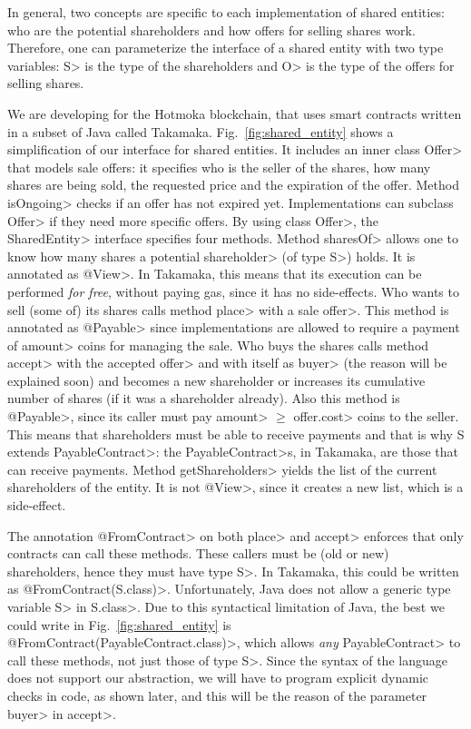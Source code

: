 In general, two concepts are specific to each implementation of shared entities:
who are the potential shareholders and how offers for selling shares work.
Therefore, one can parameterize the interface of a shared entity with two type variables:
\<S> is the type of the shareholders and \<O> is the type of the offers for selling shares.

We are developing for the Hotmoka blockchain, that uses smart contracts written in a subset
of Java called Takamaka.
Fig.~\ref{fig:shared_entity} shows a simplification of our interface for shared entities.
It includes an inner class \<Offer> that models sale offers:
it specifies who is the seller of the shares,
how many shares are being sold, the requested price and the expiration of the offer.
Method \<isOngoing> checks if an offer has not expired yet.
Implementations can subclass \<Offer> if they need more specific offers.
By using class \<Offer>, the \<SharedEntity> interface specifies four methods.
Method \<sharesOf> allows one to know how many shares a potential \<shareholder> (of type \<S>) holds.
It is annotated as \<@View>. In Takamaka, this means that its execution can be performed
\emph{for free}, without paying gas, since it has no side-effects. Who wants to sell
(some of) its shares calls method \<place> with a sale \<offer>.
This method is annotated as \<@Payable> since
implementations are allowed to require a payment of \<amount> coins for managing the sale.
Who buys the shares calls method \<accept> with the accepted \<offer>
and with itself as \<buyer> (the reason will be explained soon)
and becomes a new shareholder or increases
its cumulative number of shares (if it was a shareholder already).
Also this method is \<@Payable>, since its caller must pay \<amount> $\ge$ \<offer.cost>
coins to the seller.
This means that shareholders must be able to receive payments and that
is why \<S extends PayableContract>: the \<PayableContract>s, in Takamaka, are those that can receive
payments.
Method \<getShareholders> yields the list of the current shareholders of the entity.
It is not \<@View>, since it creates a new list, which is a side-effect.

The annotation \<@FromContract> on both \<place> and \<accept> enforces that only
contracts can call these methods.
These callers must be (old or new) shareholders,
hence they must have type \<S>. In Takamaka, this could be written
as \<@FromContract(S.class)>. Unfortunately, Java does not allow a generic type variable \<S>
in \<S.class>. Due to this syntactical limitation of Java,
the best we could write in Fig.~\ref{fig:shared_entity} is \<@FromContract(PayableContract.class)>,
which allows \emph{any} \<PayableContract> to call these methods, not just those of type \<S>.
Since the syntax of the language does not support our abstraction, we will have to
program explicit dynamic checks in code, as shown later, and this will be the reason of the
parameter \<buyer> in \<accept>.

